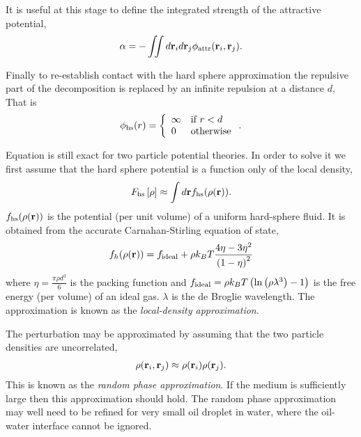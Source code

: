 It is useful at this stage to define the integrated strength of the attractive potential, 
\begin{align}
  \alpha =  - \iint d \textbf{r}_i d\textbf{r}_j \phi_{\text{attr}}( \textbf{r}_i, \textbf{r}_j).
  \label{eqn:nuc:alpha}
\end{align}

Finally to re-establish contact with the hard sphere approximation 
the repulsive part of the decomposition is replaced by an infinite repulsion at a distance $d$,
That is 
\begin{align}
  \phi_{\text{hs}}(r) = \left\{
    \begin{array}{ll}
      \infty & \text{if $r<d$}\\
      0 & \text{otherwise}
    \end{array} \right. .
\end{align}

Equation  is still exact for two particle potential theories.
In order to solve it we first  assume that the  hard sphere potential is a function only of the local density,
\begin{align}
  F_{\text{hs}} \left[ \rho \right] \approx \int d\textbf{r} f_{\text{hs}}(\rho(\textbf{r})). \label{eqn:LDA}
\end{align}
$f_{\text{hs}}(\rho(\textbf{r}))$ is the potential (per unit volume) of a uniform  hard-sphere fluid\cite{Evans1992}.
It is obtained from the accurate  Carnahan-Stirling equation of state,
\begin{align}
    f_h(\rho(\textbf{r})) =  f_{\text{ideal}} + \rho k_B T\frac{4\eta - 3\eta^2}{\left( 1-\eta \right)^2}
  \label{eqn:nuc:CS}
\end{align}
where $\eta =  \frac{\pi \rho d^3}{6}$ is the packing function and $f_{\text{ideal}} =  \rho k_B T\left( \ln \left( \rho \lambda^3 \right) -1 \right)$ is the free energy (per volume) of an ideal gas.
$\lambda$ is the de Broglie wavelength.
%
The approximation  is known as the {\em local-density approximation}.

The perturbation may be approximated by assuming that the two particle densities are uncorrelated, 
\begin{align}
\rho(\textbf{r}_i, \textbf{r}_j) \approx \rho(\textbf{r}_i)\rho(\textbf{r}_j).\label{eqn:RPA}
\end{align}
This is known as the {\em random phase approximation}.
If the medium is sufficiently large then this approximation should hold\cite{Evans1992}.
The random phase approximation may well need to be refined for very small oil droplet in water,  
where the oil-water interface cannot be ignored.

